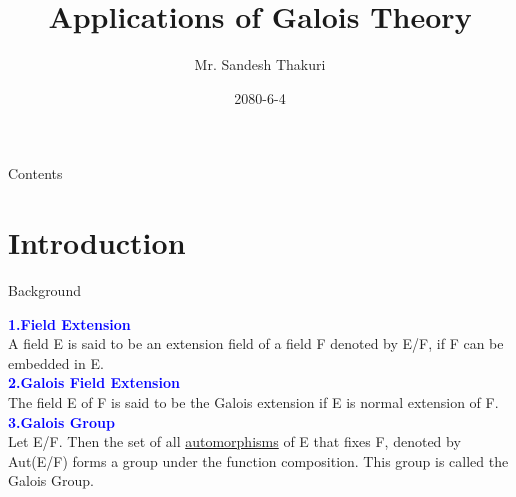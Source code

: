 \documentclass{beamer}
\title{Applications of Galois Theory}
\author[Sandesh Thakuri]{Mr. Sandesh Thakuri}
\institute[CDM, TU]
{Central Department of Mathematics, TU}
\date{2080-6-4}
\begin{document}
\myfootline

\begin{frame}[plain]
  \tikzonlytitlepage
  \titlepage
\end{frame}

\begin{frame}{Contents}
  \tableofcontents
\end{frame}

\small
\section{Introduction}
\begin{frame}{Background}

  \textcolor{blue}{\textbf{1.Field Extension}}\\[2mm]
  A field E is said to be an extension field of a field F denoted by E/F, if F can be embedded in E.\\[8mm]

  \textcolor{blue}{\textbf{2.Galois Field Extension}}\\[2mm]
  The field E of F is said to be the Galois extension if E is normal extension of F.\\[8mm]

  \textcolor{blue}{\textbf{3.Galois Group}}\\[2mm]
  Let E/F. Then the set of all \underline{automorphisms} of E that
  fixes F, denoted by Aut(E/F) forms a group under the function
  composition. This group is called the Galois Group.

\end{frame}
\end{document}
